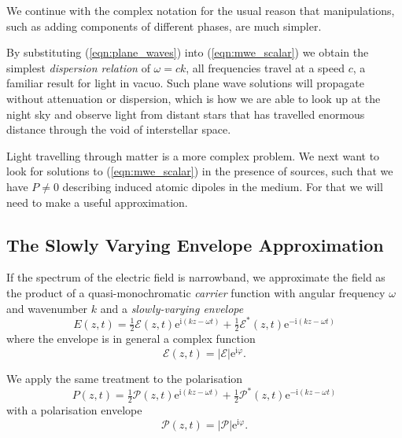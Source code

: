     We continue with the complex notation for the usual reason that
    manipulations, such as adding components of different phases, are much
    simpler.

    By substituting (\ref{eqn:plane_waves}) into (\ref{eqn:mwe_scalar}) we
    obtain the simplest \textit{dispersion relation} of $\omega = c k$, \ie all
    frequencies travel at a speed $c$, a familiar result for light in vacuo.
    Such plane wave solutions will propagate without attenuation or dispersion,
    which is how we are able to look up at the night sky and observe light from
    distant stars that has travelled enormous distance through the void of
    interstellar space.

    Light travelling through matter is a more complex problem. We next want to
    look for solutions to (\ref{eqn:mwe_scalar}) in the presence of sources,
    such that we have $P \ne 0$ describing induced atomic dipoles in the medium.
    For that we will need to make a useful approximation.

  \subsection{The Slowly Varying Envelope Approximation}

    If the spectrum of the electric field is narrowband, we approximate the
    field as the product of a quasi-monochromatic \textit{carrier} function with
    angular frequency $\omega$ and wavenumber $k$ and a \textit{slowly-varying
    envelope}
    \begin{equation}
      E(z,t) = \tfrac{1}{2} \mathcal{E}(z,t) 
                    \mathrm{e}^{\mathrm{i}(k z - \omega t)} 
                + \tfrac{1}{2} \mathcal{E}^*(z,t) 
                    \mathrm{e}^{-\mathrm{i}(k z - \omega t)}
    \end{equation}
    where the envelope is in general a complex function 
    \begin{equation}
      \mathcal{E}(z,t) = \lvert \mathcal{E} \rvert 
                            \mathrm{e}^{\mathrm{i} \varphi}.
    \end{equation}
    
    We apply the same treatment to the polarisation
    \begin{equation}
      P(z,t) = \tfrac{1}{2} \mathcal{P}(z,t) 
                    \mathrm{e}^{\mathrm{i}(k z - \omega t)} 
                + \tfrac{1}{2} \mathcal{P}^*(z,t) 
                    \mathrm{e}^{-\mathrm{i}(k z - \omega t)}
    \end{equation}
    with a polarisation envelope
    \begin{equation}
      \mathcal{P}(z,t) = \lvert \mathcal{P} \rvert 
                            \mathrm{e}^{\mathrm{i} \varphi}.
    \end{equation}


